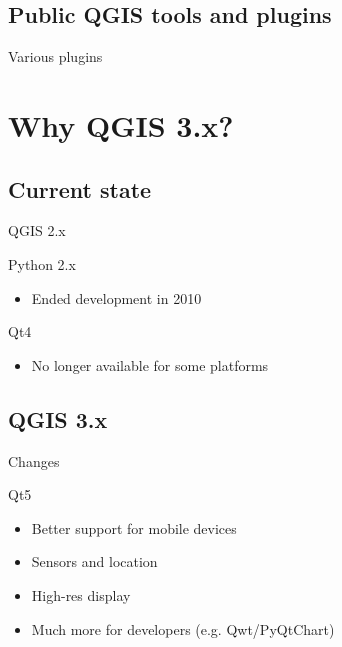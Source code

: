 \subsection{Public QGIS tools and plugins}
\begin{frame}{Various plugins}
\end{frame}

\section{Why QGIS 3.x? }
\subsection{Current state}
\begin{frame}{QGIS 2.x}
	\begin{block}{Python 2.x}
		\begin{itemize}
			\item Ended development in 2010
		\end{itemize}
	\end{block}
\begin{block}{Qt4}
	\begin{itemize}
		\item No longer available for some platforms
	\end{itemize}
\end{block}
\end{frame}

\subsection{QGIS 3.x}
\begin{frame}{Changes}
	\begin{block}{Qt5}
		\begin{itemize}
			\item Better support for mobile devices
			\item Sensors and location
			\item High-res display
			\item Much more for developers (e.g. Qwt/PyQtChart)
		\end{itemize}
	\end{block}
\end{frame}

